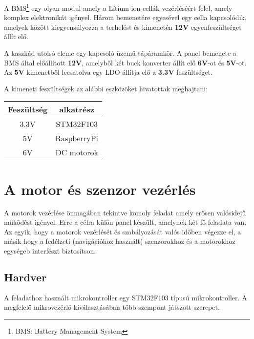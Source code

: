 A BMS\footnote{BMS: Battery Management System} egy olyan modul amely a Lítium-ion
cellák vezérléséért felel, amely komplex elektronikát igényel. Három bemenetére
egyesével egy cella kapcsolódik, amelyek között kiegyensúlyozza a terhelést és
kimenetén \textbf{12V} egyenfeszültséget állít elő.

A kaszkád utolsó eleme egy kapcsoló üzemű tápáramkör. A panel bemenete a BMS
által előállított \textbf{12V}, amelyből két buck konverter állít elő
\textbf{6V}-ot és \textbf{5V}-ot. Az \textbf{5V} kimenetből lecsatolva egy LDO
állítja elő a \textbf{3.3V} feszültséget.

A kimeneti feszültségek az alábbi eszközöket hivatottak meghajtani:

\begin{center}
  \begin{tabular}{ | c | c | }
    \hline
    Feszültség & alkatrész 
    \\ \hline
    3.3V & STM32F103 \\
    5V & RaspberryPi \\
    6V & DC motorok
    \\ \hline
  \end{tabular}
\end{center}



\section{A motor és szenzor vezérlés}

A motorok vezérlése önmagában tekintve komoly feladat amely erősen valósidejű
működést igényel. Erre a célra külön panel készült, amelynek két fő feladata van.
Az egyik, hogy a motorok vezérlését és szabályozását valós időben végezze el, a
másik hogy a fedélzeti (navigációhoz használt) szenzorokhoz és a motorokhoz
egységeb interfészt biztosítson.

\subsection{Hardver}

A feladathoz használt mikrokontroller egy STM32F103
típusú mikrokontroller. A megfelelő mikrovezérlő kiválasztásában több szempont
játszott szerepet.

